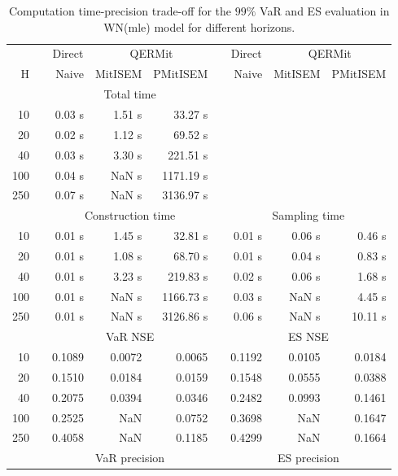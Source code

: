 { \renewcommand{\arraystretch}{1.3} 
\begin{table}[h] 
\centering 
\caption{Computation time-precision trade-off for the  $99\%$ VaR and ES evaluation in WN(mle) model for different horizons.} 
\label{tab:time_precision_WN_ML} 
\begin{tabular}{rr rrr r rrr}  
 & & \multicolumn{1}{c}{Direct} & \multicolumn{2}{c}{QERMit}&  & \multicolumn{1}{c}{Direct} & \multicolumn{2}{c}{QERMit} \\ \cline{3-5} \cline{7-9} 
 H & & Naive & MitISEM & PMitISEM & & Naive & MitISEM & PMitISEM \\ \hline 
 & & \multicolumn{3}{c}{Total time}  \\ \cline{3-5} 
10 & & 0.03 s & 1.51 s & 33.27 s  \\ 
20 & & 0.02 s & 1.12 s & 69.52 s  \\ 
40 & & 0.03 s & 3.30 s & 221.51 s  \\ 
100 & & 0.04 s &  NaN s & 1171.19 s  \\ 
250 & & 0.07 s &  NaN s & 3136.97 s  \\ 
\hline 
 & & \multicolumn{3}{c}{Construction time} & & \multicolumn{3}{c}{ Sampling time} \\ \cline{3-5}  \cline{7-9}
10 & & 0.01 s & 1.45 s & 32.81 s &&  0.01 s & 0.06 s & 0.46 s \\ 
20 & & 0.01 s & 1.08 s & 68.70 s &&  0.01 s & 0.04 s & 0.83 s \\ 
40 & & 0.01 s & 3.23 s & 219.83 s &&  0.02 s & 0.06 s & 1.68 s \\ 
100 & & 0.01 s &  NaN s & 1166.73 s &&  0.03 s &  NaN s & 4.45 s \\ 
250 & & 0.01 s &  NaN s & 3126.86 s &&  0.06 s &  NaN s & 10.11 s \\ 
\hline 
 & & \multicolumn{3}{c}{VaR NSE} &&  \multicolumn{3}{c}{ES NSE} \\ \cline{3-5}  \cline{7-9}
10 && 0.1089  & 0.0072  & 0.0065 && 0.1192  & 0.0105  & 0.0184  \\ 
20 && 0.1510  & 0.0184  & 0.0159 && 0.1548  & 0.0555  & 0.0388  \\ 
40 && 0.2075  & 0.0394  & 0.0346 && 0.2482  & 0.0993  & 0.1461  \\ 
100 && 0.2525  &    NaN  & 0.0752 && 0.3698  &    NaN  & 0.1647  \\ 
250 && 0.4058  &    NaN  & 0.1185 && 0.4299  &    NaN  & 0.1664  \\ 
\hline 
 & & \multicolumn{3}{c}{VaR precision} &&  \multicolumn{3}{c}{ES precision} \\ \cline{3-5}  \cline{7-9}

\end{tabular}
\end{table}}
